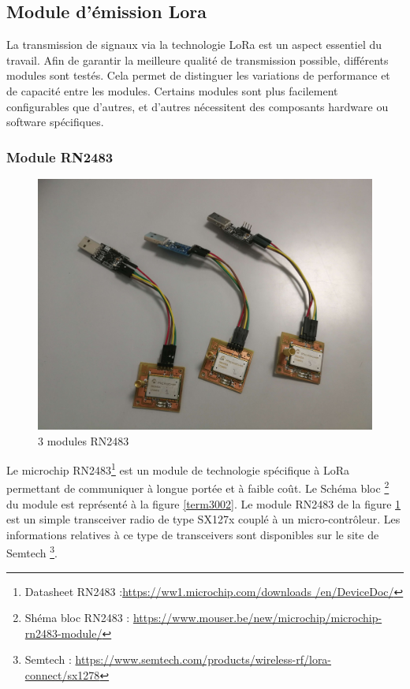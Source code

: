 \subsection{Module d'émission Lora}

La transmission de signaux via la technologie \ac{LoRa} est un aspect essentiel du travail. Afin de garantir la meilleure qualité de transmission possible, différents modules sont testés. Cela permet de distinguer les variations de performance et de capacité entre les modules. Certains modules sont plus facilement configurables que d'autres, et d'autres nécessitent des composants hardware ou software spécifiques.

\subsubsection{Module RN2483}

\begin{figure}[h]
\centering

\includegraphics[scale=0.08]{images/rn2483.png}
\caption{3 modules RN2483}\label{term34}
\end{figure}


Le microchip RN2483\footnote{Datasheet RN2483 :\href{https://ww1.microchip.com/downloads/en/DeviceDoc/40001784B.pdf}{https://ww1.microchip.com/downloads
/en/DeviceDoc/}} est un module de technologie spécifique à LoRa permettant de communiquer à longue portée et à faible coût. Le Schéma bloc \footnote{Shéma bloc RN2483 : \href{https://www.mouser.be/new/microchip/microchip-rn2483-module/}{https://www.mouser.be/new/microchip/microchip-rn2483-module/}} du module est représenté à la figure \ref{term3002}. Le module RN2483 de la figure \ref{term34} est un simple transceiver radio de type SX127x couplé à un micro-contrôleur. Les informations relatives à ce type de transceivers sont disponibles sur le site de Semtech \footnote{Semtech : \href{https://www.semtech.com/products/wireless-rf/lora-connect/sx1278}{https://www.semtech.com/products/wireless-rf/lora-connect/sx1278}}.


